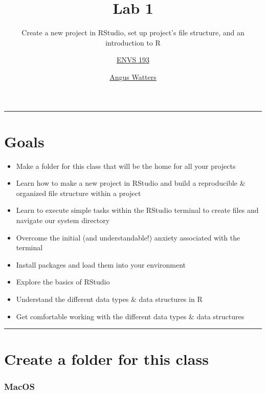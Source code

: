 \documentclass[
]{article}
\title{Lab 1}
\subtitle{Create a new project in RStudio, set up project's file structure, and an
introduction to R}
\author{\href{index.html}{ENVS 193}}
\date{\href{https://github.com/anguswg-ucsb}{Angus Watters}}
\providecommand{\tightlist}{%
  \setlength{\itemsep}{0pt}\setlength{\parskip}{0pt}}
\begin{document}
\maketitle

\begin{center}\rule{0.5\linewidth}{0.5pt}\end{center}

\hypertarget{goals}{%
\section{\texorpdfstring{\textbf{Goals}}{Goals}}\label{goals}}

\begin{itemize}
\tightlist
\item
  Make a folder for this class that will be the home for all your
  projects
\item
  Learn how to make a new project in RStudio and build a reproducible \&
  organized file structure within a project
\item
  Learn to execute simple tasks within the RStudio terminal to create
  files and navigate our system directory
\item
  Overcome the initial (and understandable!) anxiety associated with the
  terminal
\item
  Install packages and load them into your environment
\item
  Explore the basics of RStudio
\item
  Understand the different data types \& data structures in R
\item
  Get comfortable working with the different data types \& data
  structures
\end{itemize}

\begin{center}\rule{0.5\linewidth}{0.5pt}\end{center}

\hypertarget{create-a-folder-for-this-class}{%
\section{\texorpdfstring{\textbf{Create a folder for this
class}}{Create a folder for this class}}\label{create-a-folder-for-this-class}}

\hypertarget{macos}{%
\subsubsection{\texorpdfstring{\textbf{MacOS }}{MacOS }}\label{macos}}
\end{document}
